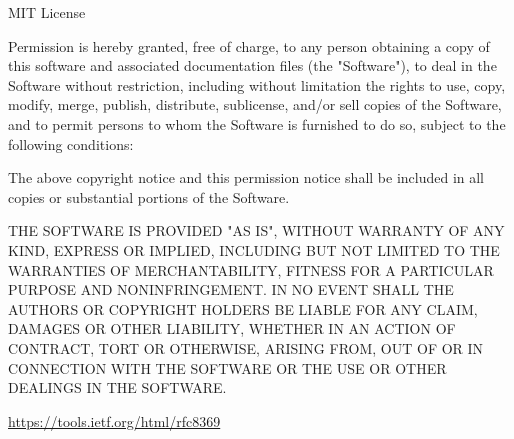 \documentclass[11pt,a4paper,notitlepage,fleqn]{article}
\begin{document}
	MIT License
	
	Permission is hereby granted, free of charge, to any person obtaining a copy of this software and associated documentation files (the "Software"), to deal in the Software without restriction, including without limitation the rights to use, copy, modify, merge, publish, distribute, sublicense, and/or sell copies of the Software, and to permit persons to whom the Software is furnished to do so, subject to the following conditions:
	
	The above copyright notice and this permission notice shall be included in all copies or substantial portions of the Software.
	
	THE SOFTWARE IS PROVIDED "AS IS", WITHOUT WARRANTY OF ANY KIND, EXPRESS OR IMPLIED, INCLUDING BUT NOT LIMITED TO THE WARRANTIES OF MERCHANTABILITY, FITNESS FOR A PARTICULAR PURPOSE AND NONINFRINGEMENT. IN NO EVENT SHALL THE AUTHORS OR COPYRIGHT HOLDERS BE LIABLE FOR ANY CLAIM, DAMAGES OR OTHER LIABILITY, WHETHER IN AN ACTION OF CONTRACT, TORT OR OTHERWISE, ARISING FROM, OUT OF OR IN CONNECTION WITH THE SOFTWARE OR THE USE OR OTHER DEALINGS IN THE SOFTWARE.


\url{https://tools.ietf.org/html/rfc8369}
\end{document}
